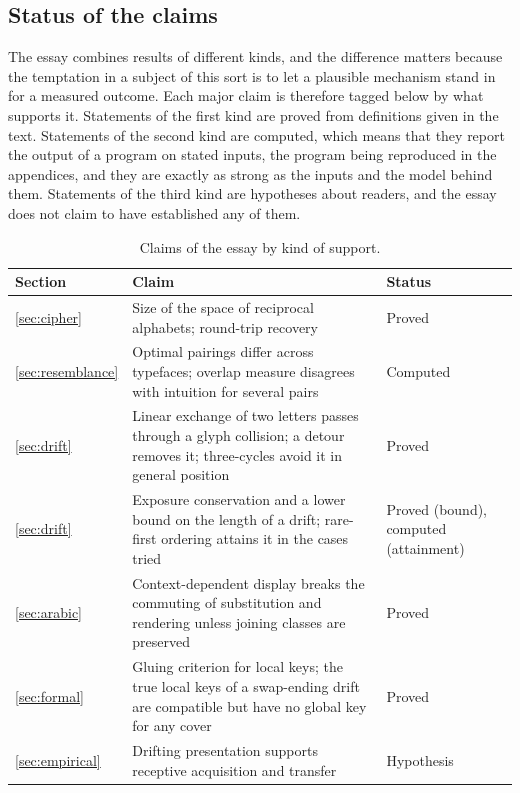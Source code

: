 \subsection{Status of the claims}

The essay combines results of different kinds, and the difference matters because the temptation in a subject of this sort is to let a plausible mechanism stand in for a measured outcome. Each major claim is therefore tagged below by what supports it. Statements of the first kind are proved from definitions given in the text. Statements of the second kind are computed, which means that they report the output of a program on stated inputs, the program being reproduced in the appendices, and they are exactly as strong as the inputs and the model behind them. Statements of the third kind are hypotheses about readers, and the essay does not claim to have established any of them.

\begin{table}[ht]
\centering
\small
\renewcommand{\arraystretch}{1.25}
\begin{tabular}{>{\raggedright\arraybackslash}p{2.7cm}>{\raggedright\arraybackslash}p{6.3cm}>{\raggedright\arraybackslash}p{2.7cm}}
\toprule
Section & Claim & Status\\
\midrule
\ref{sec:cipher} & Size of the space of reciprocal alphabets; round-trip recovery & Proved\\
\ref{sec:resemblance} & Optimal pairings differ across typefaces; overlap measure disagrees with intuition for several pairs & Computed\\
\ref{sec:drift} & Linear exchange of two letters passes through a glyph collision; a detour removes it; three-cycles avoid it in general position & Proved\\
\ref{sec:drift} & Exposure conservation and a lower bound on the length of a drift; rare-first ordering attains it in the cases tried & Proved (bound), computed (attainment)\\
\ref{sec:arabic} & Context-dependent display breaks the commuting of substitution and rendering unless joining classes are preserved & Proved\\
\ref{sec:formal} & Gluing criterion for local keys; the true local keys of a swap-ending drift are compatible but have no global key for any cover & Proved\\
\ref{sec:empirical} & Drifting presentation supports receptive acquisition and transfer & Hypothesis\\
\bottomrule
\end{tabular}
\caption{Claims of the essay by kind of support.}\label{tab:status}
\end{table}

